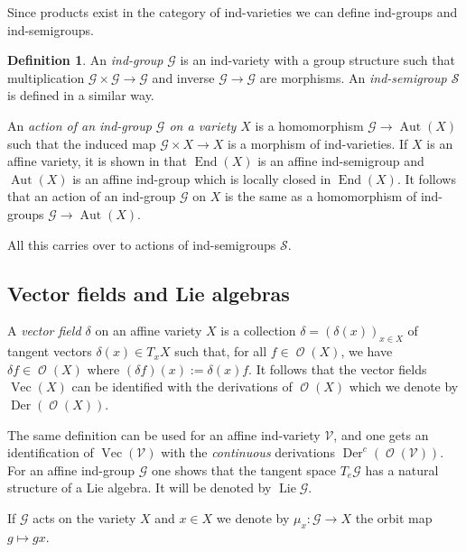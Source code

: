\documentclass{amsart}
\theoremstyle{definition}
\newtheorem{defn}[thm]{Definition}
\theoremstyle{remark}
\begin{document}
Since products exist in the category of ind-varieties we can define ind-groups and ind-semigroups.

\begin{defn}
An {\it ind-group} ${\mathcal G}$ is an ind-variety with a group structure such that multiplication ${\mathcal G}\times{\mathcal G} \to {\mathcal G}$ and inverse ${\mathcal G} \to {\mathcal G}$ are morphisms. An {\it ind-semigroup ${\mathcal S}$} is defined in a similar way.
\end{defn}

An {\it action of an ind-group ${\mathcal G}$ on a variety $X$} is a homomorphism ${\mathcal G} \to \operatorname{Aut}(X)$ such that the induced map ${\mathcal G}\times X \to X$ is a morphism of ind-varieties. 
If $X$ is an affine variety, it is shown in \cite{FuKr2015On-the-geometry-of} that $\operatorname{End}(X)$ is an affine ind-semigroup and $\operatorname{Aut}(X)$ is an affine ind-group which is locally closed in $\operatorname{End}(X)$. It follows that an action of an ind-group ${\mathcal G}$ on $X$ is the same as a homomorphism of ind-groups ${\mathcal G} \to \operatorname{Aut}(X)$.

All this carries over to actions of ind-semigroups ${\mathcal S}$.

{\par\smallskip}
\subsection{Vector fields and Lie algebras}
A {\it vector field $\delta$} on an affine variety $X$ is a collection $\delta=(\delta(x))_{x\in X}$ of tangent vectors $\delta(x)\in T_{x}X$ such that, for all $f \in \operatorname{\mathcal O}(X)$, we have $\delta f \in \operatorname{\mathcal O}(X)$ where $(\delta f)(x):=\delta(x)f$. It follows that the vector fields $\operatorname{Vec}(X)$ can be identified with the derivations of $\operatorname{\mathcal O}(X)$ which we denote by $\operatorname{Der}(\operatorname{\mathcal O}(X))$.

The same definition can be used for an affine ind-variety ${\mathcal V}$, and one gets an identification of $\operatorname{Vec}({\mathcal V})$ with the {\it continuous\/} derivations ${\operatorname{Der}^{c}}(\operatorname{\mathcal O}({\mathcal V}))$. For an affine ind-group ${\mathcal G}$ one shows that the tangent space $T_{e}{\mathcal G}$ has a natural structure of a Lie algebra. It will be denoted by $\operatorname{Lie}{\mathcal G}$.

If ${\mathcal G}$ acts on the variety $X$ and $x \in X$ we denote by $\mu_{x}\colon {\mathcal G} \to X$ the orbit map $g\mapsto gx$.
\end{document}
